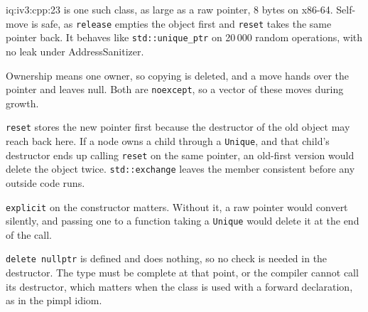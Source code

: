 \begin{solution}{iq:iv3:cpp:23}
 is one such class, as large as a raw pointer, 8 bytes on x86-64. Self-move is safe, as \texttt{release} empties the object first and \texttt{reset} takes the same pointer back. It behaves like \texttt{std::unique\_ptr} on 20\,000 random operations, with no leak under AddressSanitizer.
\label{lst:iv3:cp:unique}

Ownership means one owner, so copying is deleted, and a move hands over the pointer and leaves null. Both are \texttt{noexcept}, so a vector of these moves during growth.

\texttt{reset} stores the new pointer first because the destructor of the old object may reach back here. If a node owns a child through a \texttt{Unique}, and that child's destructor ends up calling \texttt{reset} on the same pointer, an old-first version would delete the object twice. \texttt{std::exchange} leaves the member consistent before any outside code runs.

\texttt{explicit} on the constructor matters. Without it, a raw pointer would convert silently, and passing one to a function taking a \texttt{Unique} would delete it at the end of the call.

\texttt{delete nullptr} is defined and does nothing, so no check is needed in the destructor. The type must be complete at that point, or the compiler cannot call its destructor, which matters when the class is used with a forward declaration, as in the pimpl idiom.

\end{solution}

